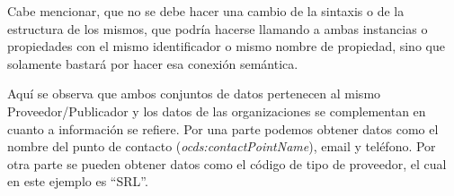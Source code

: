 Cabe mencionar, que no se debe hacer una cambio de la sintaxis o de la estructura de los mismos, que podría hacerse llamando a ambas instancias o propiedades con el mismo identificador o mismo nombre de propiedad, sino que solamente bastará por hacer esa conexión semántica.

Aquí se observa que ambos conjuntos de datos pertenecen al mismo Proveedor/Publicador y los datos de las organizaciones se complementan en cuanto a información se refiere. Por una parte podemos obtener datos como el nombre del punto de contacto (\textit{ocds:contactPointName}), email y teléfono. Por otra parte se pueden obtener datos como el código de tipo de proveedor, el cual en este ejemplo es “SRL”. 

    